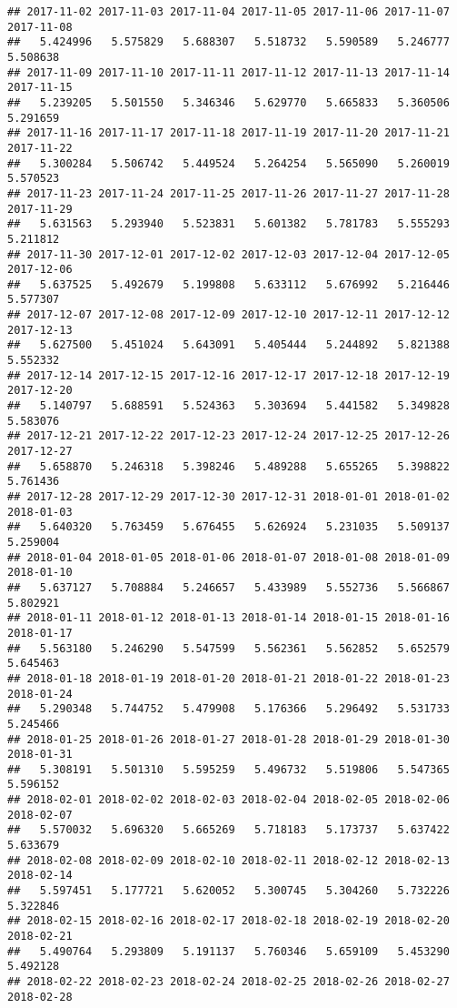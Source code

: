 \documentclass[
]{article}
\begin{document}
\begin{verbatim}
## 2017-11-02 2017-11-03 2017-11-04 2017-11-05 2017-11-06 2017-11-07 2017-11-08 
##   5.424996   5.575829   5.688307   5.518732   5.590589   5.246777   5.508638 
## 2017-11-09 2017-11-10 2017-11-11 2017-11-12 2017-11-13 2017-11-14 2017-11-15 
##   5.239205   5.501550   5.346346   5.629770   5.665833   5.360506   5.291659 
## 2017-11-16 2017-11-17 2017-11-18 2017-11-19 2017-11-20 2017-11-21 2017-11-22 
##   5.300284   5.506742   5.449524   5.264254   5.565090   5.260019   5.570523 
## 2017-11-23 2017-11-24 2017-11-25 2017-11-26 2017-11-27 2017-11-28 2017-11-29 
##   5.631563   5.293940   5.523831   5.601382   5.781783   5.555293   5.211812 
## 2017-11-30 2017-12-01 2017-12-02 2017-12-03 2017-12-04 2017-12-05 2017-12-06 
##   5.637525   5.492679   5.199808   5.633112   5.676992   5.216446   5.577307 
## 2017-12-07 2017-12-08 2017-12-09 2017-12-10 2017-12-11 2017-12-12 2017-12-13 
##   5.627500   5.451024   5.643091   5.405444   5.244892   5.821388   5.552332 
## 2017-12-14 2017-12-15 2017-12-16 2017-12-17 2017-12-18 2017-12-19 2017-12-20 
##   5.140797   5.688591   5.524363   5.303694   5.441582   5.349828   5.583076 
## 2017-12-21 2017-12-22 2017-12-23 2017-12-24 2017-12-25 2017-12-26 2017-12-27 
##   5.658870   5.246318   5.398246   5.489288   5.655265   5.398822   5.761436 
## 2017-12-28 2017-12-29 2017-12-30 2017-12-31 2018-01-01 2018-01-02 2018-01-03 
##   5.640320   5.763459   5.676455   5.626924   5.231035   5.509137   5.259004 
## 2018-01-04 2018-01-05 2018-01-06 2018-01-07 2018-01-08 2018-01-09 2018-01-10 
##   5.637127   5.708884   5.246657   5.433989   5.552736   5.566867   5.802921 
## 2018-01-11 2018-01-12 2018-01-13 2018-01-14 2018-01-15 2018-01-16 2018-01-17 
##   5.563180   5.246290   5.547599   5.562361   5.562852   5.652579   5.645463 
## 2018-01-18 2018-01-19 2018-01-20 2018-01-21 2018-01-22 2018-01-23 2018-01-24 
##   5.290348   5.744752   5.479908   5.176366   5.296492   5.531733   5.245466 
## 2018-01-25 2018-01-26 2018-01-27 2018-01-28 2018-01-29 2018-01-30 2018-01-31 
##   5.308191   5.501310   5.595259   5.496732   5.519806   5.547365   5.596152 
## 2018-02-01 2018-02-02 2018-02-03 2018-02-04 2018-02-05 2018-02-06 2018-02-07 
##   5.570032   5.696320   5.665269   5.718183   5.173737   5.637422   5.633679 
## 2018-02-08 2018-02-09 2018-02-10 2018-02-11 2018-02-12 2018-02-13 2018-02-14 
##   5.597451   5.177721   5.620052   5.300745   5.304260   5.732226   5.322846 
## 2018-02-15 2018-02-16 2018-02-17 2018-02-18 2018-02-19 2018-02-20 2018-02-21 
##   5.490764   5.293809   5.191137   5.760346   5.659109   5.453290   5.492128 
## 2018-02-22 2018-02-23 2018-02-24 2018-02-25 2018-02-26 2018-02-27 2018-02-28 

\end{verbatim}
\end{document}
